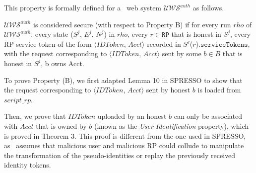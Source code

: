 


\vspace{3mm} This property is formally defined for a \usso\ web system $\mathcal{UWS}^{auth}$ as follows. 

\begin{definition}
\label{def:B}
$\mathcal{UWS}^{auth}$ is considered secure (with respect to Property B) if for every run $rho$ of $\mathcal{UWS}^{auth}$, every state ($S^j$, $E^j$, $N^j$) in $rho$, every $r \in \mathtt{RP}$ that is honest in $S^j$, every RP service token of the form $\langle IDToken$, $Acct \rangle$ recorded in $S^j$($r$).$\mathtt{serviceTokens}$, with the request corresponding to $\langle IDToken$, $Acct \rangle$ sent by some $b \in B$ that is honest in $S^j$, b owns Acct.
\end{definition}

To prove Property (B), we first adapted Lemma 10 in SPRESSO to show that the request corresponding to $\langle IDToken$, $Acct \rangle$ sent by honest $b$ is loaded from $script\_rp$. 

Then, we prove that $IDToken$ uploaded by an honest $b$ can only be associated with $Acct$ that is owned by $b$ (known as the {\em User Identification} property), which is proved in Theorem 3. This proof is different from the one used in SPRESSO, as \usso\ assumes that malicious user and malicious RP could collude to manipulate the transformation of the pseudo-identities or replay the previously received identity tokens.



